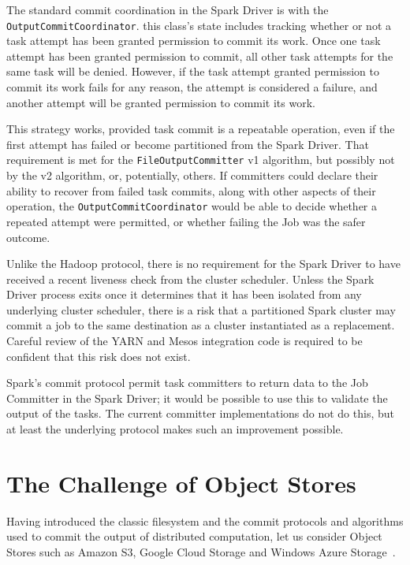 \documentclass[conference]{IEEEtran}
\begin{document}
The standard commit coordination in the Spark Driver is with the
\texttt{OutputCommitCoordinator}.
this class's state includes tracking whether or not a task attempt
has been granted permission to commit its work.
Once one task attempt has been granted permission to commit,
all other task attempts for the same task will be denied.
However, if the task attempt granted permission to commit its work fails
for any reason, the attempt is considered a failure, and
another attempt will be granted permission to commit its work.

This strategy works, provided task commit is a repeatable operation,
even if the first attempt has failed or become partitioned from the
Spark Driver.
That requirement is met for the \texttt{FileOutputCommitter} v1 algorithm,
but possibly not by the v2 algorithm, or, potentially, others.
If committers could declare their ability to recover from
failed task commits, along with other aspects of their operation,
the \texttt{OutputCommitCoordinator} would be able to decide whether
a repeated attempt were permitted, or whether failing the Job was the
safer outcome.


Unlike the Hadoop protocol, there is no requirement for the Spark Driver
to have received a recent liveness check from the cluster scheduler.
Unless the Spark Driver process exits once it determines that it has been
isolated from any underlying cluster scheduler, there is a risk that
a partitioned Spark cluster may commit a job to the same destination
as a cluster instantiated as a replacement.
Careful review of the YARN and Mesos integration code is required to be
confident that this risk does not exist.

Spark's commit protocol permit task committers to return data to
the Job Committer in the Spark Driver;
it would be possible to use this to validate the output of the tasks.
The current committer implementations do not do this, but at least the underlying
protocol makes such an improvement possible.





\section{The Challenge of Object Stores}
\label{sec:object-stores}

Having introduced the classic filesystem and the commit protocols and algorithms
used to commit the output of distributed computation, let us consider
Object Stores such as Amazon S3, Google Cloud Storage and
Windows Azure Storage\ \cite{AWS-S3-intro,Calder11}.
\end{document}

